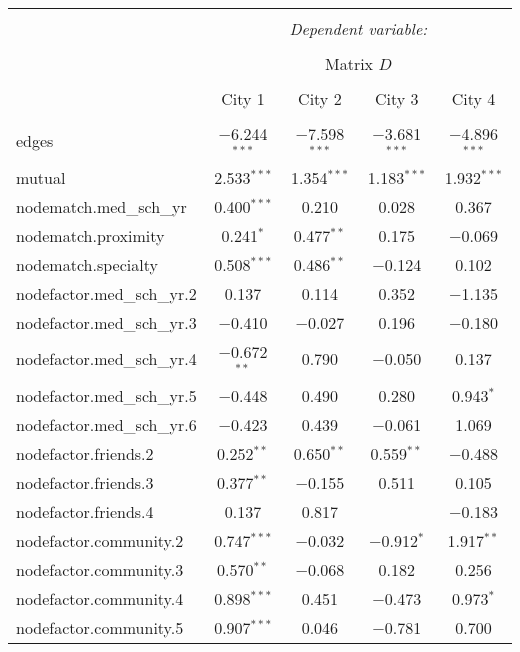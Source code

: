 \documentclass[11pt]{article}
\begin{document}
\begin{table}[!htbp] \centering 
  \caption{} 
  \label{} 
\begin{tabular}{@{\extracolsep{5pt}}lcccc} 
\\[-1.8ex]\hline 
\hline \\[-1.8ex] 
 & \multicolumn{4}{c}{\textit{Dependent variable:}} \\ 
\cline{2-5} 
\\[-1.8ex] & \multicolumn{4}{c}{Matrix $D$} \\ 
\\[-1.8ex] & City 1 & City 2 & City 3 & City 4\\ 
\hline \\[-1.8ex] 
 edges & $-$6.244$^{***}$ & $-$7.598$^{***}$ & $-$3.681$^{***}$ & $-$4.896$^{***}$ \\ 
  mutual & 2.533$^{***}$ & 1.354$^{***}$ & 1.183$^{***}$ & 1.932$^{***}$ \\ 
  nodematch.med\_sch\_yr & 0.400$^{***}$ & 0.210 & 0.028 & 0.367 \\ 
  nodematch.proximity & 0.241$^{*}$ & 0.477$^{**}$ & 0.175 & $-$0.069 \\ 
  nodematch.specialty & 0.508$^{***}$ & 0.486$^{**}$ & $-$0.124 & 0.102 \\ 
  nodefactor.med\_sch\_yr.2 & 0.137 & 0.114 & 0.352 & $-$1.135 \\ 
  nodefactor.med\_sch\_yr.3 & $-$0.410 & $-$0.027 & 0.196 & $-$0.180 \\ 
  nodefactor.med\_sch\_yr.4 & $-$0.672$^{**}$ & 0.790 & $-$0.050 & 0.137 \\ 
  nodefactor.med\_sch\_yr.5 & $-$0.448 & 0.490 & 0.280 & 0.943$^{*}$ \\ 
  nodefactor.med\_sch\_yr.6 & $-$0.423 & 0.439 & $-$0.061 & 1.069 \\ 
  nodefactor.friends.2 & 0.252$^{**}$ & 0.650$^{**}$ & 0.559$^{**}$ & $-$0.488 \\ 
  nodefactor.friends.3 & 0.377$^{**}$ & $-$0.155 & 0.511 & 0.105 \\ 
  nodefactor.friends.4 & 0.137 & 0.817 &  & $-$0.183 \\ 
  nodefactor.community.2 & 0.747$^{***}$ & $-$0.032 & $-$0.912$^{*}$ & 1.917$^{**}$ \\ 
  nodefactor.community.3 & 0.570$^{**}$ & $-$0.068 & 0.182 & 0.256 \\ 
  nodefactor.community.4 & 0.898$^{***}$ & 0.451 & $-$0.473 & 0.973$^{*}$ \\ 
  nodefactor.community.5 & 0.907$^{***}$ & 0.046 & $-$0.781 & 0.700 \\ 

\end{tabular}
\end{table}
\end{document}
